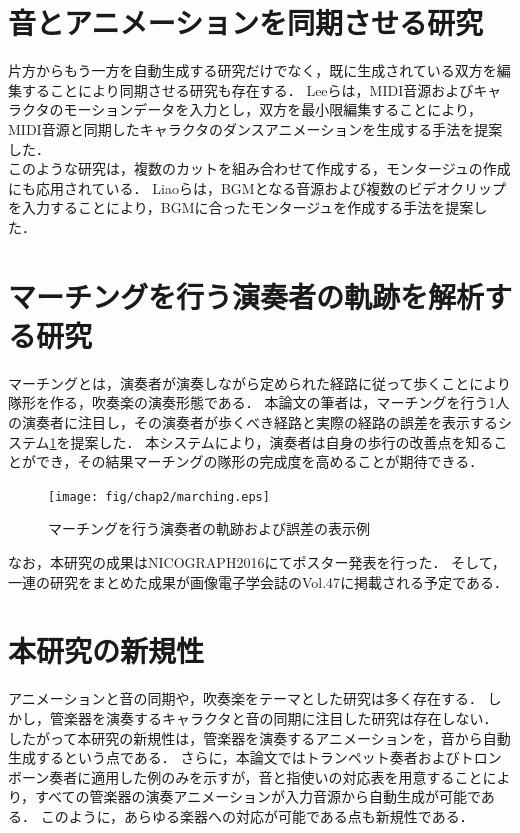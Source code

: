 \section{音とアニメーションを同期させる研究} \label{sec:synchronization}
片方からもう一方を自動生成する研究だけでなく，既に生成されている双方を編集することにより同期させる研究も存在する．
Leeら\cite{Lee}は，MIDI音源およびキャラクタのモーションデータを入力とし，双方を最小限編集することにより，MIDI音源と同期したキャラクタのダンスアニメーションを生成する手法を提案した．\\
\indent
このような研究は，複数のカットを組み合わせて作成する，モンタージュの作成にも応用されている．
Liaoら\cite{Liao}は，BGMとなる音源および複数のビデオクリップを入力することにより，BGMに合ったモンタージュを作成する手法を提案した．

\section{マーチングを行う演奏者の軌跡を解析する研究} \label{sec:marching}
マーチングとは，演奏者が演奏しながら定められた経路に従って歩くことにより隊形を作る，吹奏楽の演奏形態である．
本論文の筆者は，マーチングを行う1人の演奏者に注目し，その演奏者が歩くべき経路と実際の経路の誤差を表示するシステム\ref{fig:marching}を提案した．
本システムにより，演奏者は自身の歩行の改善点を知ることができ，その結果マーチングの隊形の完成度を高めることが期待できる．
\begin{figure}[h]
	\centering
	\texttt{[image: fig/chap2/marching.eps]}
	\caption{マーチングを行う演奏者の軌跡および誤差の表示例}
	\label{fig:marching}
\end{figure}
なお，本研究の成果はNICOGRAPH2016にてポスター発表\cite{NICOGRAPH}を行った．
そして，一連の研究をまとめた成果が画像電子学会誌のVol.47\cite{iieej}に掲載される予定である．

\section{本研究の新規性}\label{sec:compere}
アニメーションと音の同期や，吹奏楽をテーマとした研究は多く存在する．
しかし，管楽器を演奏するキャラクタと音の同期に注目した研究は存在しない．
したがって本研究の新規性は，管楽器を演奏するアニメーションを，音から自動生成するという点である．
さらに，本論文ではトランペット奏者およびトロンボーン奏者に適用した例のみを示すが，音と指使いの対応表を用意することにより，すべての管楽器の演奏アニメーションが入力音源から自動生成が可能である．
このように，あらゆる楽器への対応が可能である点も新規性である．